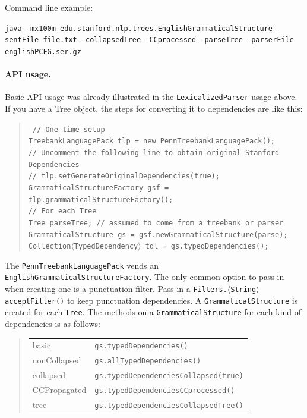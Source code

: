 \documentclass[11pt,letterpaper]{article}
\begin{document}
\bigskip

\noindent Command line example:\\
{\hangindent=0.5in\raggedright\texttt{java -mx100m edu.stanford.nlp.trees.EnglishGrammaticalStructure -sentFile file.txt -collapsedTree -CCprocessed -parseTree -parserFile englishPCFG.ser.gz}\\}

\paragraph{API usage.} Basic API usage was already
illustrated in the \texttt{LexicalizedParser} usage above.  If you
have a Tree object, the steps for converting it to dependencies are
like this:
\begin{quote}
\texttt{
// One time setup \\
TreebankLanguagePack tlp = new PennTreebankLanguagePack(); \\
// Uncomment the following line to obtain original Stanford Dependencies\\
// tlp.setGenerateOriginalDependencies(true); \\
GrammaticalStructureFactory gsf = tlp.grammaticalStructureFactory(); \\
// For each Tree \\
Tree parseTree; // assumed to come from a treebank or parser \\
GrammaticalStructure gs = gsf.newGrammaticalStructure(parse); \\
Collection$\langle$TypedDependency$\rangle$ tdl = gs.typedDependencies();
}
\end{quote}
The \texttt{PennTreebankLanguagePack} vends an
\texttt{EnglishGrammaticalStructureFactory}. The only common option
to pass in when creating one is a punctuation filter. Pass in a
\texttt{Filters.$\langle$String$\rangle$\discretionary{}{}{}acceptFilter()} to keep
punctuation dependencies. A \texttt{GrammaticalStructure} is created
for each \texttt{Tree}. The methods on a \texttt{GrammaticalStructure}
for each kind of dependencies is as follows:
\begin{quote}
\begin{tabular}{ll}
basic & \texttt{gs.typedDependencies()} \\
nonCollapsed & \texttt{gs.allTypedDependencies()} \\
collapsed & \texttt{gs.typedDependenciesCollapsed(true)} \\
CCPropagated & \texttt{gs.typedDependenciesCCprocessed()} \\
tree & \texttt{gs.typedDependenciesCollapsedTree()} \\
\end{tabular}
\end{quote}
\end{document}
